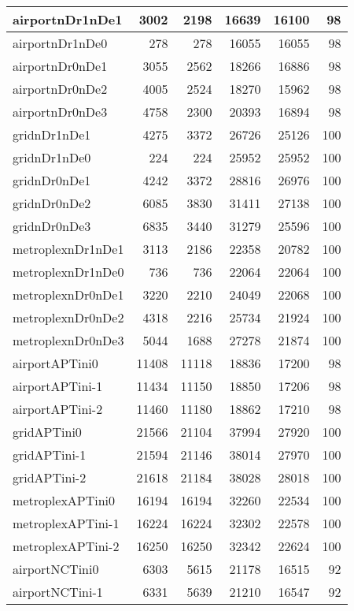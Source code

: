 \begin{longtable}{|l|r|r|r|r|r|}
\endlastfoot
airportnDr1nDe1 & 3002 & 2198 & 16639 & 16100 & 98 \\ \hline
airportnDr1nDe0 & 278 & 278 & 16055 & 16055 & 98 \\ \hline
airportnDr0nDe1 & 3055 & 2562 & 18266 & 16886 & 98 \\ \hline
airportnDr0nDe2 & 4005 & 2524 & 18270 & 15962 & 98 \\ \hline
airportnDr0nDe3 & 4758 & 2300 & 20393 & 16894 & 98 \\ \hline
gridnDr1nDe1 & 4275 & 3372 & 26726 & 25126 & 100 \\ \hline
gridnDr1nDe0 & 224 & 224 & 25952 & 25952 & 100 \\ \hline
gridnDr0nDe1 & 4242 & 3372 & 28816 & 26976 & 100 \\ \hline
gridnDr0nDe2 & 6085 & 3830 & 31411 & 27138 & 100 \\ \hline
gridnDr0nDe3 & 6835 & 3440 & 31279 & 25596 & 100 \\ \hline
metroplexnDr1nDe1 & 3113 & 2186 & 22358 & 20782 & 100 \\ \hline
metroplexnDr1nDe0 & 736 & 736 & 22064 & 22064 & 100 \\ \hline
metroplexnDr0nDe1 & 3220 & 2210 & 24049 & 22068 & 100 \\ \hline
metroplexnDr0nDe2 & 4318 & 2216 & 25734 & 21924 & 100 \\ \hline
metroplexnDr0nDe3 & 5044 & 1688 & 27278 & 21874 & 100 \\ \hline
airportAPTini0 & 11408 & 11118 & 18836 & 17200 & 98 \\ \hline
airportAPTini-1 & 11434 & 11150 & 18850 & 17206 & 98 \\ \hline
airportAPTini-2 & 11460 & 11180 & 18862 & 17210 & 98 \\ \hline
gridAPTini0 & 21566 & 21104 & 37994 & 27920 & 100 \\ \hline
gridAPTini-1 & 21594 & 21146 & 38014 & 27970 & 100 \\ \hline
gridAPTini-2 & 21618 & 21184 & 38028 & 28018 & 100 \\ \hline
metroplexAPTini0 & 16194 & 16194 & 32260 & 22534 & 100 \\ \hline
metroplexAPTini-1 & 16224 & 16224 & 32302 & 22578 & 100 \\ \hline
metroplexAPTini-2 & 16250 & 16250 & 32342 & 22624 & 100 \\ \hline
airportNCTini0 & 6303 & 5615 & 21178 & 16515 & 92 \\ \hline
airportNCTini-1 & 6331 & 5639 & 21210 & 16547 & 92 \\ \hline

\end{longtable}
